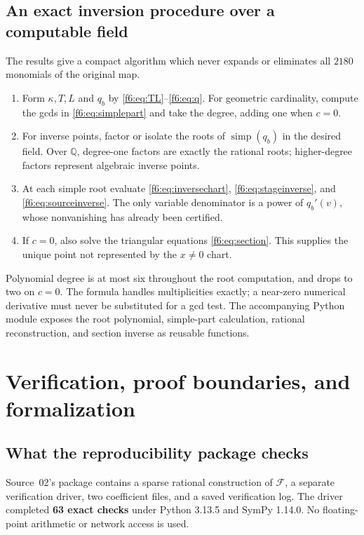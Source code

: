 \documentclass[11pt,a4paper]{article}
\theoremstyle{definition}
\newcommand{\Q}{\mathbb Q}
\newcommand{\simp}{\operatorname{simp}}
\newcommand{\F}{\mathcal F}
\newcommand{\kk}{\kappa}
\begin{document}
\subsection{An exact inversion procedure over a computable field}
The results give a compact algorithm which never expands or eliminates
all $2180$ monomials of the original map.
\begin{enumerate}[label=\textbf{Step \arabic*.}]
\item Form $\kk,T,L$ and $q_b$ by \eqref{f6:eq:TL}--\eqref{f6:eq:q}. For geometric
cardinality, compute the gcds in \eqref{f6:eq:simplepart} and take the degree,
adding one when $c=0$.
\item For inverse points, factor or isolate the roots of $\simp(q_b)$ in
the desired field. Over $\Q$, degree-one factors are exactly the rational
roots; higher-degree factors represent algebraic inverse points.
\item At each simple root evaluate \eqref{f6:eq:inversechart},
\eqref{f6:eq:stageinverse}, and \eqref{f6:eq:sourceinverse}. The only variable
denominator is a power of $q_b'(v)$, whose nonvanishing has already been
certified.
\item If $c=0$, also solve the triangular equations \eqref{f6:eq:section}.
This supplies the unique point not represented by the $x\ne0$ chart.
\end{enumerate}
Polynomial degree is at most six throughout the root computation, and
drops to two on $c=0$. The formula handles multiplicities exactly; a
near-zero numerical derivative must never be substituted for a gcd test.
The accompanying Python module exposes the root polynomial, simple-part
calculation, rational reconstruction, and section inverse as reusable
functions.

\section{Verification, proof boundaries, and formalization}
\label{f6:sec:verification}

\subsection{What the reproducibility package checks}
Source~02's package contains a sparse rational construction of $\F$, a separate
verification driver, two coefficient files, and a saved verification log.
The driver completed \textbf{63 exact checks} under Python 3.13.5 and
SymPy 1.14.0. No floating-point arithmetic or network access is used.
\end{document}
